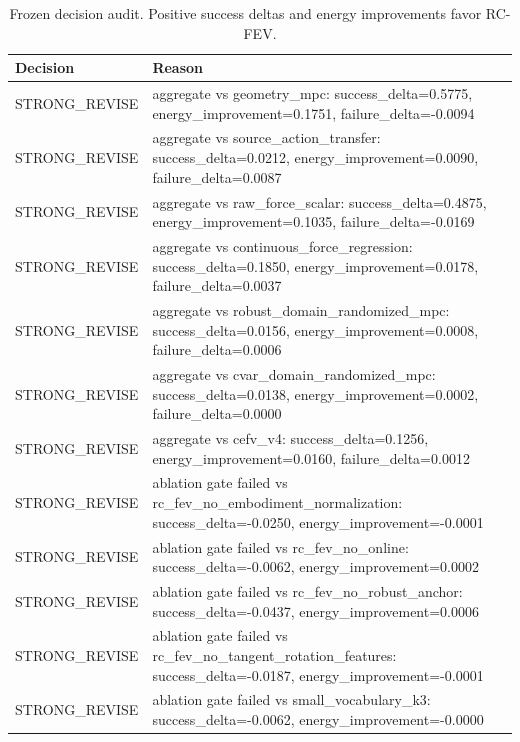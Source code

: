 \begin{table}[t]
\centering
\scriptsize
\caption{Frozen decision audit. Positive success deltas and energy improvements favor RC-FEV.}
\label{tab:decision}
\begin{tabular}{ll}
\toprule
Decision & Reason \\
\midrule
STRONG\_REVISE & aggregate vs geometry\_mpc: success\_delta=0.5775, energy\_improvement=0.1751, failure\_delta=-0.0094 \\
STRONG\_REVISE & aggregate vs source\_action\_transfer: success\_delta=0.0212, energy\_improvement=0.0090, failure\_delta=0.0087 \\
STRONG\_REVISE & aggregate vs raw\_force\_scalar: success\_delta=0.4875, energy\_improvement=0.1035, failure\_delta=-0.0169 \\
STRONG\_REVISE & aggregate vs continuous\_force\_regression: success\_delta=0.1850, energy\_improvement=0.0178, failure\_delta=0.0037 \\
STRONG\_REVISE & aggregate vs robust\_domain\_randomized\_mpc: success\_delta=0.0156, energy\_improvement=0.0008, failure\_delta=0.0006 \\
STRONG\_REVISE & aggregate vs cvar\_domain\_randomized\_mpc: success\_delta=0.0138, energy\_improvement=0.0002, failure\_delta=0.0000 \\
STRONG\_REVISE & aggregate vs cefv\_v4: success\_delta=0.1256, energy\_improvement=0.0160, failure\_delta=0.0012 \\
STRONG\_REVISE & ablation gate failed vs rc\_fev\_no\_embodiment\_normalization: success\_delta=-0.0250, energy\_improvement=-0.0001 \\
STRONG\_REVISE & ablation gate failed vs rc\_fev\_no\_online: success\_delta=-0.0062, energy\_improvement=0.0002 \\
STRONG\_REVISE & ablation gate failed vs rc\_fev\_no\_robust\_anchor: success\_delta=-0.0437, energy\_improvement=0.0006 \\
STRONG\_REVISE & ablation gate failed vs rc\_fev\_no\_tangent\_rotation\_features: success\_delta=-0.0187, energy\_improvement=-0.0001 \\
STRONG\_REVISE & ablation gate failed vs small\_vocabulary\_k3: success\_delta=-0.0062, energy\_improvement=-0.0000 \\
\bottomrule
\end{tabular}
\end{table}
